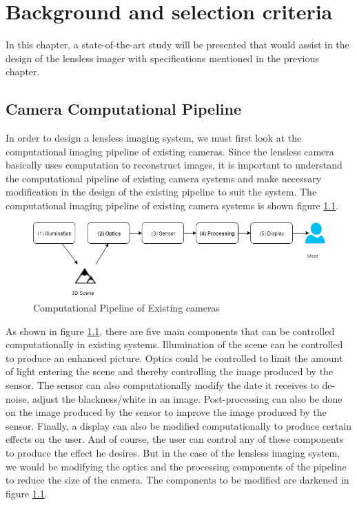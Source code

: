 \chapter{Background and selection criteria}
\label{chp:LitSurvey}
In this chapter, a state-of-the-art study will be presented that would assist in the design of the lensless imager with specifications mentioned in the previous chapter.
\section{Camera Computational Pipeline}
In order to design a lensless imaging system, we must first look at the computational imaging pipeline of existing cameras. Since the lensless camera basically uses computation to reconstruct images, it is important to understand the computational pipeline of existing camera systems and make necessary modification in the design of the existing pipeline to suit the system. The computational imaging pipeline of existing camera systems is shown figure \ref{fig:CompPipeline}\cite{CompPipeline}.
\begin{figure}[htb]
\includegraphics[width=\textwidth]{pics/CompPipeline}
\caption{Computational Pipeline of Existing cameras}
\label{fig:CompPipeline}
\end{figure}
As shown in figure \ref{fig:CompPipeline}, there are five main components that can be controlled computationally in existing systems. Illumination of the scene can be controlled to produce an enhanced picture. Optics could be controlled to limit the amount of light entering the scene and thereby controlling the image produced by the sensor. The sensor can also computationally modify the date it receives to de-noise, adjust the blackness/white in an image. Post-processing can also be done on the image produced by the sensor to improve the image produced by the sensor. Finally, a display can also be modified computationally to produce certain effects on the user. And of course, the user can control any of these components to produce the effect he desires. But in the case of the lensless imaging system, we would be modifying the optics and the processing components of the pipeline to reduce the size of the camera. The components to be modified are darkened in figure \ref{fig:CompPipeline}. 

